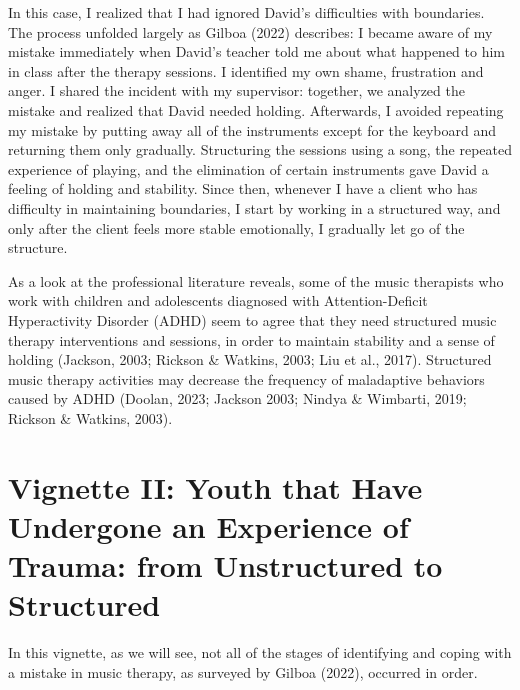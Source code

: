 \documentclass[authordate, empirical, issue]{jote-new-article}
\begin{document}
In this case, I realized that I had ignored David's difficulties with boundaries. The process unfolded largely as Gilboa (2022) describes: I became aware of my mistake immediately when David's teacher told me about what happened to him in class after the therapy sessions. I identified my own shame, frustration and anger. I shared the incident with my supervisor: together, we analyzed the mistake and realized that David needed holding. Afterwards, I avoided repeating my mistake by putting away all of the instruments except for the keyboard and returning them only gradually. Structuring the sessions using a song, the repeated experience of playing, and the elimination of certain instruments gave David a feeling of holding and stability. Since then, whenever I have a client who has difficulty in maintaining boundaries, I start by working in a structured way, and only after the client feels more stable emotionally, I gradually let go of the structure.



As a look at the professional literature reveals, some of the music therapists who work with children and adolescents diagnosed with Attention-Deficit Hyperactivity Disorder (ADHD) seem to agree that they need structured music therapy interventions and sessions, in order to maintain stability and a sense of holding (Jackson, 2003; Rickson \& Watkins, 2003; Liu et al., 2017). Structured music therapy activities may decrease the frequency of maladaptive behaviors caused by ADHD (Doolan, 2023; Jackson 2003; Nindya \& Wimbarti, 2019; Rickson \& Watkins, 2003).







\section{Vignette II: Youth that Have Undergone an Experience of Trauma: from Unstructured to Structured}



In this vignette, as we will see, not all of the stages of identifying and coping with a mistake in music therapy, as surveyed by Gilboa (2022), occurred in order.
\end{document}
